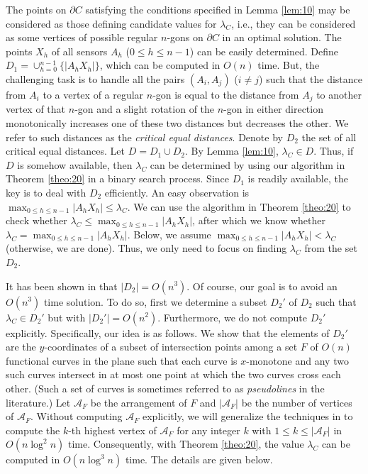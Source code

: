 \documentclass[11pt]{article}
\def\calA{\mathcal{A}}
\begin{document}
The points on $\partial C$ satisfying the conditions specified in
Lemma \ref{lem:10}
may be considered as those defining candidate values for $\lambda_C$,
i.e., they can be considered as some vertices of possible regular
$n$-gons on $\partial C$ in an optimal solution. The points $X_{h}$
of all sensors $A_h$ ($0 \leq h \leq n-1$) can be easily determined.
Define $D_1=\cup_{h=0}^{n-1}\{|A_hX_h|\}$, which can be computed in
$O(n)$ time. But, the challenging task is to handle all the pairs
$(A_i, A_j)$ ($i \neq j$) such that the distance from $A_i$ to a
vertex of a regular $n$-gon is equal to the distance from $A_j$ to
another vertex of that $n$-gon and a slight rotation of the $n$-gon
in either direction monotonically increases one of these two
distances but decreases the other. We refer to such distances as the
{\it critical equal distances}. Denote by $D_2$ the set of all critical equal
distances. Let $D=D_1\cup D_2$. By Lemma \ref{lem:10}, $\lambda_C\in
D$. Thus, if $D$ is somehow available, then $\lambda_C$ can be
determined by using our algorithm in Theorem \ref{theo:20} in a binary search process. Since
$D_1$ is readily available, the key is to deal with $D_2$
efficiently. An easy observation is $\max_{0\leq h\leq n-1}|A_hX_h|\leq \lambda_C$.
We can use the algorithm in Theorem \ref{theo:20} to check whether
$\lambda_C\leq \max_{0\leq h\leq n-1}|A_hX_h|$, after which we know
whether $\lambda_C=\max_{0\leq h\leq n-1}|A_hX_h|$. Below, we assume
$\max_{0\leq h\leq n-1}|A_hX_h|< \lambda_C$ (otherwise, we are
done). Thus, we only need to focus on finding $\lambda_C$ from the set $D_2$.




It has been shown in \cite{ref:TanNe10} that $|D_2|=O(n^3)$.
Of course, our goal is to avoid an $O(n^3)$ time solution.
To do so, first we determine a subset $D_2'$ of $D_2$ such that
$\lambda_C\in D_2'$ but with $|D_2'|=O(n^2)$.
Furthermore, we do not compute $D_2'$ explicitly. Specifically, our
idea is as follows. We show that the elements of $D_2'$ are the
$y$-coordinates of a subset of intersection points among a set $F$ of $O(n)$
functional curves in the plane such that each curve is $x$-monotone and any two
such curves intersect in at most one point at which the two curves cross
each other. (Such a set of curves is sometimes referred to as
{\em pseudolines} in the literature.) Let $\calA_F$ be the arrangement
of $F$ and $|\calA_F|$ be the number of vertices of $\calA_F$. Without
computing $\calA_F$ explicitly, we will generalize the techniques in
\cite{ref:ColeAn89} to compute the $k$-th highest vertex of
$\calA_F$ for any integer $k$ with $1\leq k\leq |\calA_F|$ in
$O(n\log^2 n)$ time. Consequently, with Theorem \ref{theo:20}, the
value $\lambda_C$ can be computed in $O(n\log^3 n)$ time. The
details are given below.
\end{document}
